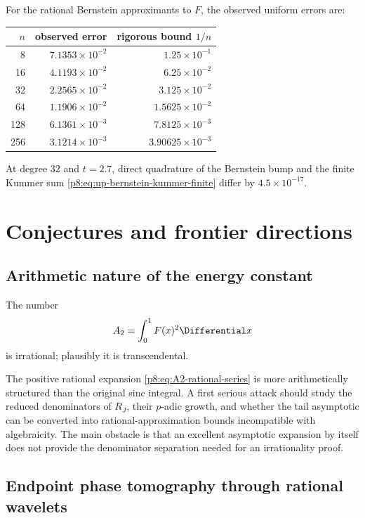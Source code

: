 \documentclass[11pt]{article}
\theoremstyle{definition}
\theoremstyle{remark}
\begin{document}
For the rational Bernstein approximants to $F$, the observed uniform errors
are:
\begin{center}
\begin{tabular}{@{}rrr@{}}
\toprule
$n$ & observed error & rigorous bound $1/n$\\
\midrule
8   & $7.1353\times10^{-2}$ & $1.25\times10^{-1}$\\
16  & $4.1193\times10^{-2}$ & $6.25\times10^{-2}$\\
32  & $2.2565\times10^{-2}$ & $3.125\times10^{-2}$\\
64  & $1.1906\times10^{-2}$ & $1.5625\times10^{-2}$\\
128 & $6.1361\times10^{-3}$ & $7.8125\times10^{-3}$\\
256 & $3.1214\times10^{-3}$ & $3.90625\times10^{-3}$\\
\bottomrule
\end{tabular}
\end{center}
At degree $32$ and $t=2.7$, direct quadrature of the Bernstein bump and the
finite Kummer sum \eqref{p8:eq:up-bernstein-kummer-finite} differ by
$4.5\times10^{-17}$.

\section{Conjectures and frontier directions}
\label{p8:sec:frontier}

\subsection{Arithmetic nature of the energy constant}

\begin{conjecture}
\label{p8:conj:A2-irrational}
The number
\[
 A_2=\int_0^1F(x)^2\Differential x
\]
is irrational; plausibly it is transcendental.
\end{conjecture}

The positive rational expansion \eqref{p8:eq:A2-rational-series} is more
arithmetically structured than the original sinc integral.  A first serious
attack should study the reduced denominators of $R_J$, their $p$-adic growth,
and whether the tail asymptotic can be converted into rational-approximation
bounds incompatible with algebraicity.  The main obstacle is that an
excellent asymptotic expansion by itself does not provide the denominator
separation needed for an irrationality proof.

\subsection{Endpoint phase tomography through rational wavelets}
\end{document}
